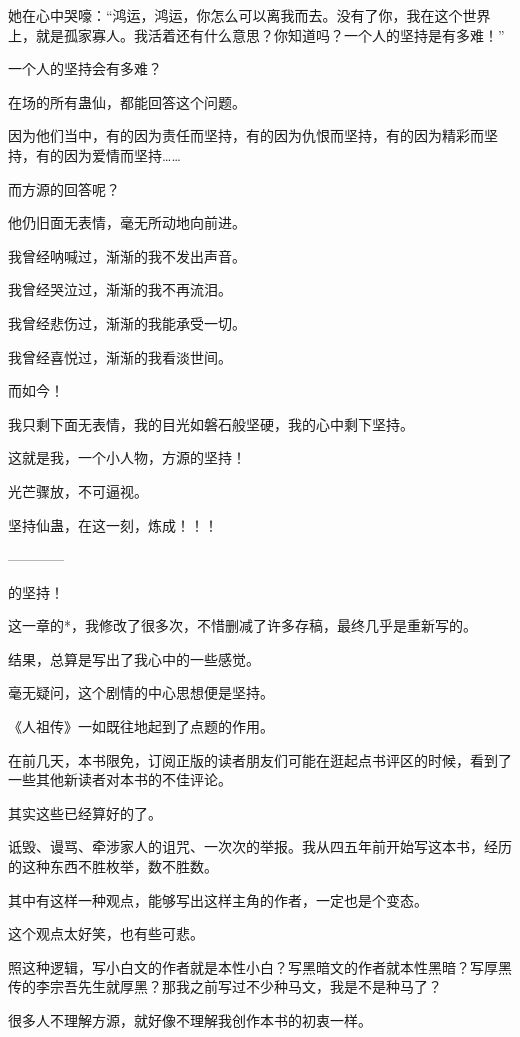 \begin{this_body}
她在心中哭嚎：“鸿运，鸿运，你怎么可以离我而去。没有了你，我在这个世界上，就是孤家寡人。我活着还有什么意思？你知道吗？一个人的坚持是有多难！”

一个人的坚持会有多难？

在场的所有蛊仙，都能回答这个问题。

因为他们当中，有的因为责任而坚持，有的因为仇恨而坚持，有的因为精彩而坚持，有的因为爱情而坚持……

而方源的回答呢？

他仍旧面无表情，毫无所动地向前进。

我曾经呐喊过，渐渐的我不发出声音。

我曾经哭泣过，渐渐的我不再流泪。

我曾经悲伤过，渐渐的我能承受一切。

我曾经喜悦过，渐渐的我看淡世间。

而如今！

我只剩下面无表情，我的目光如磐石般坚硬，我的心中剩下坚持。

这就是我，一个小人物，方源的坚持！

光芒骤放，不可逼视。

坚持仙蛊，在这一刻，炼成！！！

------------

的坚持！

这一章的*，我修改了很多次，不惜删减了许多存稿，最终几乎是重新写的。

结果，总算是写出了我心中的一些感觉。

毫无疑问，这个剧情的中心思想便是坚持。

《人祖传》一如既往地起到了点题的作用。

在前几天，本书限免，订阅正版的读者朋友们可能在逛起点书评区的时候，看到了一些其他新读者对本书的不佳评论。

其实这些已经算好的了。

诋毁、谩骂、牵涉家人的诅咒、一次次的举报。我从四五年前开始写这本书，经历的这种东西不胜枚举，数不胜数。

其中有这样一种观点，能够写出这样主角的作者，一定也是个变态。

这个观点太好笑，也有些可悲。

照这种逻辑，写小白文的作者就是本性小白？写黑暗文的作者就本性黑暗？写厚黑传的李宗吾先生就厚黑？那我之前写过不少种马文，我是不是种马了？

很多人不理解方源，就好像不理解我创作本书的初衷一样。


\end{this_body}
